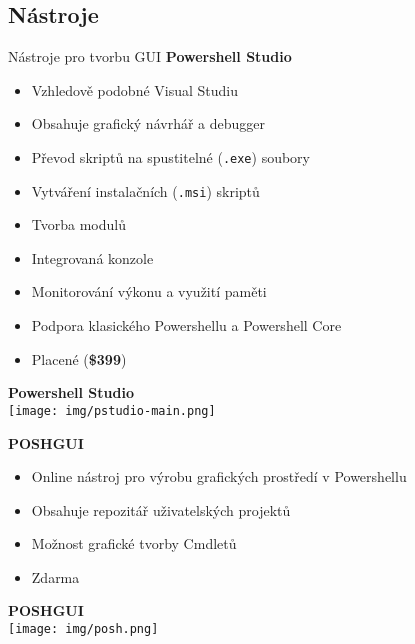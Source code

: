 \documentclass[main.tex]{subfiles}
\begin{document}
\subsection{Nástroje}
\begin{frame}[allowframebreaks]{Nástroje pro tvorbu GUI}
  \textbf{Powershell Studio}
\begin{itemize}
  \item Vzhledově podobné Visual Studiu
  \item Obsahuje grafický návrhář a debugger
  \item Převod skriptů na spustitelné (\texttt{.exe}) soubory
  \item Vytváření instalačních (\texttt{.msi}) skriptů
  \item Tvorba modulů
  \item Integrovaná konzole
  \item Monitorování výkonu a využití paměti
  \item Podpora klasického Powershellu a Powershell Core
  \item Placené (\textbf{\$399})
\end{itemize}
\begin{center}
\textbf{Powershell Studio}\\
\vspace{3mm}
\texttt{[image: img/pstudio-main.png]}
\end{center}
\framebreak
\textbf{POSHGUI}
\begin{itemize}
  \item Online nástroj pro výrobu grafických prostředí v Powershellu
  \item Obsahuje repozitář uživatelských projektů
  \item Možnost grafické tvorby Cmdletů
  \item Zdarma
\end{itemize}
\framebreak
\begin{center}
\textbf{POSHGUI}\\
\vspace{3mm}
\texttt{[image: img/posh.png]}
\end{center}
\end{frame}
\end{document}
